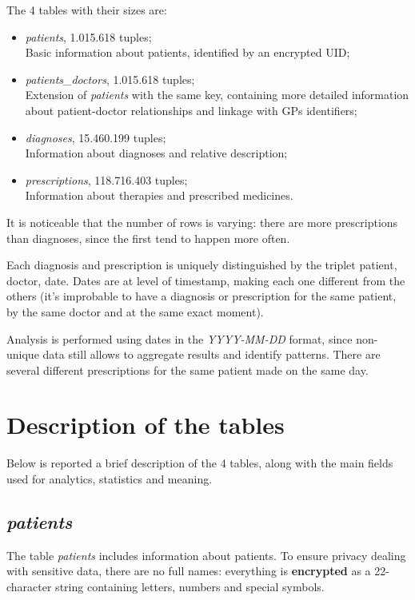 The 4 tables with their sizes are:
\begin{itemize}
	\item \textit{patients}, 1.015.618 tuples; \\
	Basic information about patients, identified by an encrypted UID;
	\item \textit{patients\_doctors}, 1.015.618 tuples; \\
	Extension of \textit{patients} with the same key, containing more detailed information about patient-doctor relationships and linkage with GPs identifiers;
	\item \textit{diagnoses}, 15.460.199 tuples; \\
	Information about diagnoses and relative description;
	\item \textit{prescriptions}, 118.716.403 tuples; \\
	Information about therapies and prescribed medicines.
\end{itemize}

It is noticeable that the number of rows is varying: there are more prescriptions than diagnoses, since the first tend to happen more often.

Each diagnosis and prescription is uniquely distinguished by the triplet {patient, doctor, date}. Dates are at level of timestamp, making each one different from the others (it's improbable to have a diagnosis or prescription for the same patient, by the same doctor and at the same exact moment). 

Analysis is performed using dates in the \textit{YYYY-MM-DD} format, since non-unique data still allows to aggregate results and identify patterns. There are several different prescriptions for the same patient made on the same day.

\section{Description of the tables}
Below is reported a brief description of the 4 tables, along with the main fields used for analytics, statistics and meaning.

\subsection{\textit{patients}}
The table \textit{patients} includes information about patients. To ensure privacy dealing with sensitive data, there are no full names: everything is \textbf{encrypted} as a 22-character string containing letters, numbers and special symbols.

